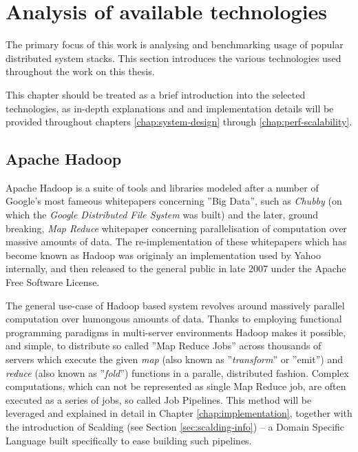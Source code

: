 \chapter{Analysis of available technologies}
\label{cha:existing-and-selected-tech}

The primary focus of this work is analysing and benchmarking usage of popular distributed system stacks. 
This section introduces the various technologies used throughout the work on this thesis.

This chapter should be treated as a brief introduction into the selected technologies, as in-depth explanations and and implementation details will be provided throughout chapters \ref{chap:system-design} through \ref{chap:perf-scalability}.

\section{Apache Hadoop}
\label{sec:hadoop}

Apache Hadoop is a suite of tools and libraries modeled after a number of Google's most fameous whitepapers concerning ''Big Data'', such as \textit{Chubby} \cite{chubby} (on which the \textit{Google Distributed File System} \cite{gfs} was built) and the later, ground breaking, \textit{Map Reduce} \cite{map-reduce} whitepaper concerning parallelisation of computation over massive amounts of data.
The re-implementation of these whitepapers which has become known as Hadoop was originaly an implementation used by Yahoo \cite{yahoo} internally, and then released to the general public in late 2007 under the Apache Free Software License.

The general use-case of Hadoop based system revolves around massively parallel computation over humongous amounts of data. Thanks to employing functional programming paradigms in multi-server environments Hadoop makes it possible, and simple, to distribute so called ''Map Reduce Jobs'' across thousands of servers which execute the given \textit{map} (also known as ''\textit{transform}'' or ''emit'') and \textit{reduce} (also known as ''\textit{fold}'') functions in a paralle, distributed fashion. Complex computations, which can not be represented as single Map Reduce job, are often executed as a series of jobs, so called Job Pipelines. This method will be leveraged and explained in detail in Chapter \ref{chap:implementation}, together with the introduction of Scalding (see Section \ref{sec:scalding-info}) -- a Domain Specific Language built specifically to ease building such pipelines.

